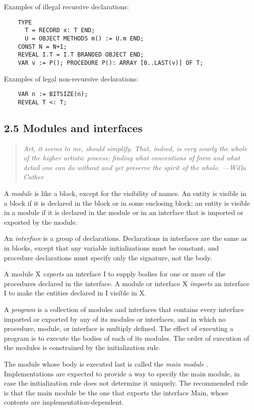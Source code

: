 \documentclass[10pt]{article}
\begin{document}
Examples of illegal recursive declarations:
\begin{verbatim}
    TYPE
      T = RECORD x: T END;
      U = OBJECT METHODS m() := U.m END;
    CONST N = N+1;
    REVEAL I.T = I.T BRANDED OBJECT END;
    VAR v := P(); PROCEDURE P(): ARRAY [0..LAST(v)] OF T;
\end{verbatim}

Examples of legal non-recursive declarations:
\begin{verbatim}
    VAR n := BITSIZE(n);
    REVEAL T <: T;
\end{verbatim}

\subsection*{2.5 Modules and interfaces}

\begin{quote}
  \emph{ Art, it seems to me, should simplify. That, indeed, is very nearly the whole of the higher artistic process; finding what conventions of form and what detail one can do without and yet preserve the spirit of the whole. ---Willa Cather }
\end{quote}

A \emph{module}
is like a block, except for the visibility of names. An entity is visible in a block if it is declared in the block or in some enclosing block; an entity is visible in a module if it is declared in the module or in an interface that is imported or exported by the module.

An \emph{interface} is a group of declarations. Declarations in interfaces are
the same as in blocks, except that any variable initializations must be
constant, and procedure declarations must specify only the signature, not the
body.

A module X \emph{exports} an interface I to supply bodies for one or more of
the procedures declared in the interface. A module or interface X
\emph{imports} an interface I to make the entities declared in I visible in X.

A \emph{program} is a collection of modules and interfaces that contains every
interface imported or exported by any of its modules or interfaces, and in
which no procedure, module, or interface is multiply defined. The effect of
executing a program is to execute the bodies of each of its modules. The order
of execution of the modules is constrained by the initialization rule.

The module whose body is executed last is called the \emph{main module}
. Implementations are expected to provide a way to specify the main module, in
case the initialization rule does not determine it uniquely. The recommended
rule is that the main module be the one that exports the interface Main, whose
contents are implementation-dependent.
\end{document}
